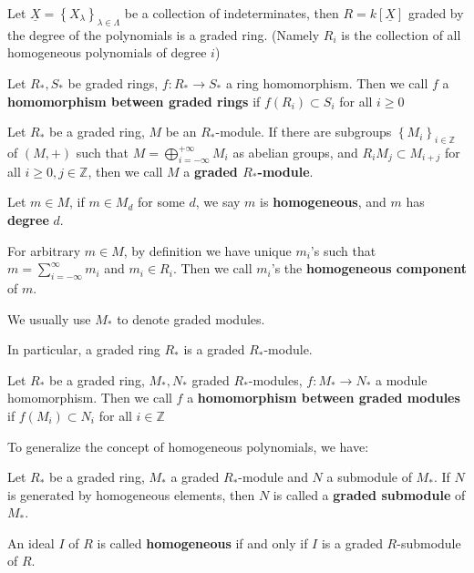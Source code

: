 \documentclass{note-eng}
\begin{document}
\begin{example}
    Let $\underline{X} = \left\lbrace X_{\lambda} \right\rbrace_{\lambda \in \Lambda}$ be a collection of indeterminates, then $R = k[\underline{X}]$ graded by the degree of the polynomials is a graded ring. (Namely $R_i$ is the collection of all homogeneous polynomials of degree $i$)
\end{example}


\begin{definition}
    Let $R_{\ast}, S_{\ast}$ be graded rings, $f: R_{\ast} \rightarrow S_{\ast}$ a ring homomorphism. Then we call $f$ a \textbf{homomorphism between graded rings} if $f(R_i) \subset S_i$ for all $i \ge 0$
\end{definition}

\begin{definition}
    Let $R_\ast$ be a graded ring, $M$ be an $R_\ast$-module. If there are subgroups $\left\lbrace M_i \right\rbrace_{i \in \mathbb{Z}}$ of $(M, +)$ such that $M = \bigoplus\limits_{i = -\infty}^{+\infty} M_i$ as abelian groups, and $R_iM_j \subset M_{i + j}$ for all $i \ge 0, j \in \mathbb{Z}$, then we call $M$ a \textbf{graded $R_\ast$-module}.

    Let $m \in M$, if $m \in M_d$ for some $d$, we say $m$ is \textbf{homogeneous}, and $m$ has \textbf{degree} $d$.

    For arbitrary $m \in M$, by definition we have unique $m_i$'s such that $m = \sum\limits_{i = -\infty}^{\infty} m_i$ and $m_i \in R_i$. Then we call $m_i$'s the \textbf{homogeneous component} of $m$.

    We usually use $M_\ast$ to denote graded modules.
\end{definition}

In particular, a graded ring $R_\ast$ is a graded $R_\ast$-module.

\begin{definition}
    Let $R_\ast$ be a graded ring, $M_\ast, N_\ast$ graded $R_\ast$-modules, $f: M_\ast \rightarrow N_\ast$ a module homomorphism. Then we call $f$ a \textbf{homomorphism between graded modules} if $f(M_i) \subset N_i$ for all $i \in \mathbb{Z}$
\end{definition}

To generalize the concept of homogeneous polynomials, we have:

\begin{definition}
    Let $R_\ast$ be a graded ring, $M_\ast$ a graded $R_\ast$-module and $N$ a submodule of $M_\ast$. If $N$ is generated by homogeneous elements, then $N$ is called a \textbf{graded submodule} of $M_\ast$.

    An ideal $I$ of $R$ is called \textbf{homogeneous} if and only if $I$ is a graded $R$-submodule of $R$.
\end{definition}
\end{document}
